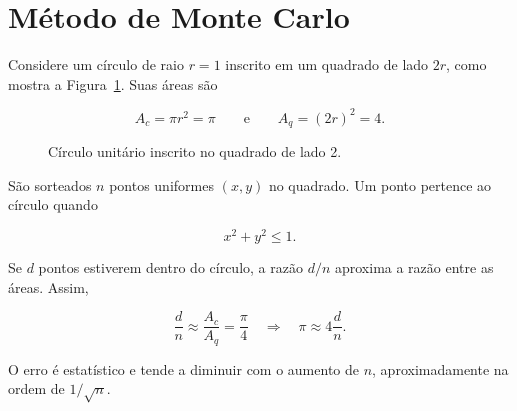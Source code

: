 \section{Método de Monte Carlo}

Considere um círculo de raio $r=1$ inscrito em um quadrado de lado $2r$, como
mostra a Figura~\ref{fig:metodo}. Suas áreas são

\begin{equation}
    A_c = \pi r^2 = \pi
    \qquad\text{e}\qquad
    A_q = (2r)^2 = 4.
\end{equation}

\begin{figure}[H]
    \centering
    \caption{Círculo unitário inscrito no quadrado de lado 2.}
    \label{fig:metodo}
\end{figure}

São sorteados $n$ pontos uniformes $(x,y)$ no quadrado. Um ponto pertence ao
círculo quando

\begin{equation}
    x^2+y^2 \leq 1.
\end{equation}

Se $d$ pontos estiverem dentro do círculo, a razão $d/n$ aproxima a razão
entre as áreas. Assim,

\begin{equation}
    \frac{d}{n}\approx\frac{A_c}{A_q}=\frac{\pi}{4}
    \quad\Longrightarrow\quad
    \pi\approx 4\frac{d}{n}.
\end{equation}

O erro é estatístico e tende a diminuir com o aumento de $n$, aproximadamente
na ordem de $1/\sqrt{n}$.
